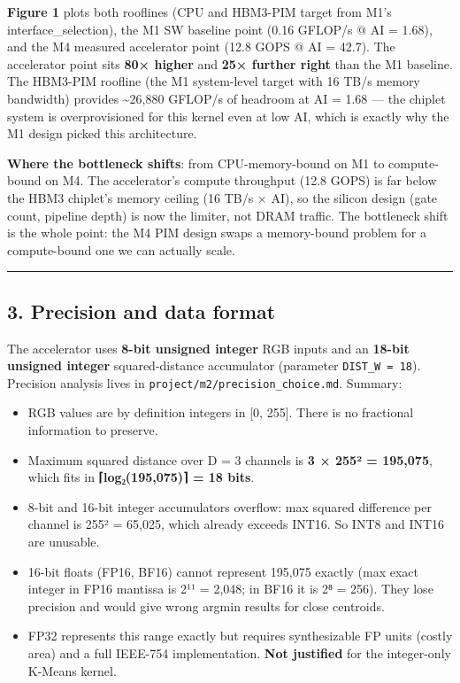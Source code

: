 \documentclass[
  10pt,
]{article}
\providecommand{\tightlist}{%
  \setlength{\itemsep}{0pt}\setlength{\parskip}{0pt}}
\begin{document}
\textbf{Figure 1} plots both rooflines (CPU and HBM3-PIM target from
M1's interface\_selection), the M1 SW baseline point (0.16 GFLOP/s @ AI
= 1.68), and the M4 measured accelerator point (12.8 GOPS @ AI = 42.7).
The accelerator point sits \textbf{80× higher} and \textbf{25× further
right} than the M1 baseline. The HBM3-PIM roofline (the M1 system-level
target with 16 TB/s memory bandwidth) provides \textasciitilde26,880
GFLOP/s of headroom at AI = 1.68 --- the chiplet system is
overprovisioned for this kernel even at low AI, which is exactly why the
M1 design picked this architecture.

\textbf{Where the bottleneck shifts}: from CPU-memory-bound on M1 to
compute-bound on M4. The accelerator's compute throughput (12.8 GOPS) is
far below the HBM3 chiplet's memory ceiling (16 TB/s × AI), so the
silicon design (gate count, pipeline depth) is now the limiter, not DRAM
traffic. The bottleneck shift is the whole point: the M4 PIM design
swaps a memory-bound problem for a compute-bound one we can actually
scale.

\begin{center}\rule{0.5\linewidth}{0.5pt}\end{center}

\hypertarget{precision-and-data-format}{%
\subsection{3. Precision and data
format}\label{precision-and-data-format}}

The accelerator uses \textbf{8-bit unsigned integer} RGB inputs and an
\textbf{18-bit unsigned integer} squared-distance accumulator (parameter
\texttt{DIST\_W\ =\ 18}). Precision analysis lives in
\texttt{project/m2/precision\_choice.md}. Summary:

\begin{itemize}
\tightlist
\item
  RGB values are by definition integers in {[}0, 255{]}. There is no
  fractional information to preserve.
\item
  Maximum squared distance over D = 3 channels is \textbf{3 × 255² =
  195,075}, which fits in \textbf{⌈log₂(195,075)⌉ = 18 bits}.
\item
  8-bit and 16-bit integer accumulators overflow: max squared difference
  per channel is 255² = 65,025, which already exceeds INT16. So INT8 and
  INT16 are unusable.
\item
  16-bit floats (FP16, BF16) cannot represent 195,075 exactly (max exact
  integer in FP16 mantissa is 2¹¹ = 2,048; in BF16 it is 2⁸ = 256). They
  lose precision and would give wrong argmin results for close
  centroids.
\item
  FP32 represents this range exactly but requires synthesizable FP units
  (costly area) and a full IEEE-754 implementation. \textbf{Not
  justified} for the integer-only K-Means kernel.
\end{itemize}
\end{document}

